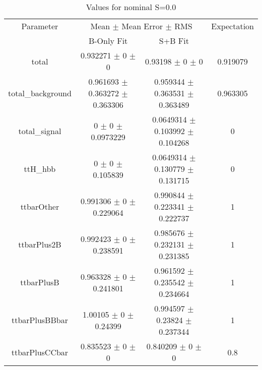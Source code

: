 \begin{table}
\centering
\caption{Values for nominal S=0.0}
\begin{tabular}{cccc}
\toprule
Parameter & \multicolumn{2}{c}{Mean $\pm$ Mean Error $\pm$ RMS} & Expectation\\
 & B-Only Fit & S+B Fit & \\
\midrule
total & \num{0.932271} $\pm$ \num{0} $\pm$ \num{0} & \num{0.93198} $\pm$ \num{0} $\pm$ \num{0} & \num{0.919079}\\
total\_background & \num{0.961693} $\pm$ \num{0.363272} $\pm$ \num{0.363306} & \num{0.959344} $\pm$ \num{0.363531} $\pm$ \num{0.363489} & \num{0.963305}\\
total\_signal & \num{0} $\pm$ \num{0} $\pm$ \num{0.0973229} & \num{0.0649314} $\pm$ \num{0.103992} $\pm$ \num{0.104268} & \num{0}\\
ttH\_hbb & \num{0} $\pm$ \num{0} $\pm$ \num{0.105839} & \num{0.0649314} $\pm$ \num{0.130779} $\pm$ \num{0.131715} & \num{0}\\
ttbarOther & \num{0.991306} $\pm$ \num{0} $\pm$ \num{0.229064} & \num{0.990844} $\pm$ \num{0.223341} $\pm$ \num{0.222737} & \num{1}\\
ttbarPlus2B & \num{0.992423} $\pm$ \num{0} $\pm$ \num{0.238591} & \num{0.985676} $\pm$ \num{0.232131} $\pm$ \num{0.231385} & \num{1}\\
ttbarPlusB & \num{0.963328} $\pm$ \num{0} $\pm$ \num{0.241801} & \num{0.961592} $\pm$ \num{0.235542} $\pm$ \num{0.234664} & \num{1}\\
ttbarPlusBBbar & \num{1.00105} $\pm$ \num{0} $\pm$ \num{0.24399} & \num{0.994597} $\pm$ \num{0.23824} $\pm$ \num{0.237344} & \num{1}\\
ttbarPlusCCbar & \num{0.835523} $\pm$ \num{0} $\pm$ \num{0} & \num{0.840209} $\pm$ \num{0} $\pm$ \num{0} & \num{0.8}\\
\bottomrule
\end{tabular}
\end{table}